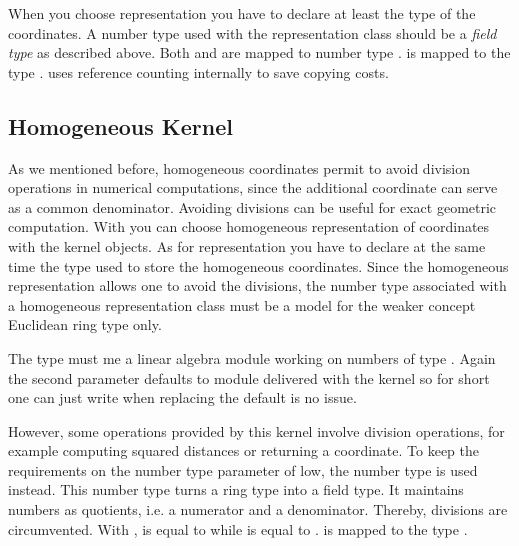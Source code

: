 When you choose  representation you have
to declare at least the type of the coordinates.  A number type used
with the  representation class should be a {\em field
  type} as described above.  Both 
and  are mapped to number type
.
 is mapped to the
type .  uses
reference counting internally to save copying costs.

\subsection{Homogeneous Kernel}
As we mentioned before, homogeneous coordinates permit to avoid
division operations in numerical computations, since the additional
coordinate can serve as a common denominator.  Avoiding divisions can
be useful for exact geometric computation.  With
 you can choose
homogeneous representation of coordinates with the kernel objects. 
As for  representation you have to declare
at the same time the type used to store the homogeneous coordinates.
Since the homogeneous representation allows one to avoid the
divisions, the number type associated with a homogeneous
representation class must be a model for the weaker concept Euclidean
ring type only. 

The type  must me a linear algebra module working
on numbers of type . Again the second parameter
defaults to module delivered with the kernel so for short one can just
write  when replacing the default
is no issue.

However, some operations provided by this kernel involve division
operations, for example computing squared distances or returning a
 coordinate.  To keep the requirements on
the number type parameter of  low, the number type
 is used instead.  This number type
turns a ring type into a field type. It maintains numbers as
quotients, i.e. a numerator and a denominator.  Thereby, divisions are
circumvented.  With ,
 is equal to
 while
 is equal to
.
 is mapped to the
type .

